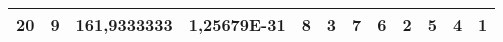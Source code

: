 \documentclass[conference]{IEEEtran}
\begin{document}
\begin{table*}[]
\begin{tabular}{|x|x|x|x|x|x|x|x|x|x|x|x|}
20                                                            & 9                                                               & 161,9333333                                                         & 1,25679E-31                                                   & 8                                                         & 3                                                         & 7                                                         & 6                                                         & 2                                                         & 5                                                         & 4                                                         & \textbf{1}                                                \\ \hline
\end{tabular}
\end{table*}
\end{document}
